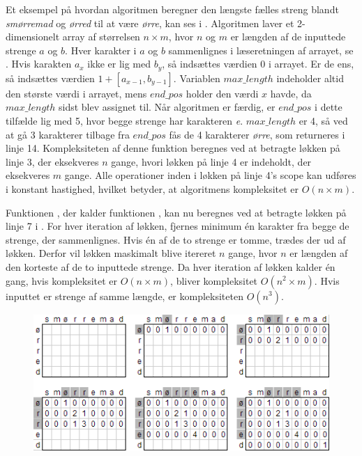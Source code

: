 Et eksempel på hvordan algoritmen beregner den længste fælles streng blandt \textit{smørremad} og \textit{ørred} til at være \textit{ørre}, kan ses i .
Algoritmen laver et 2-dimensionelt array af størrelsen $n \times m$, hvor $n$ og $m$ er længden af de inputtede strenge $a$ og $b$. Hver karakter i $a$ og $b$ sammenlignes i læseretningen af arrayet, se . Hvis karakten $a_x$ ikke er lig med $b_y$, så indsættes værdien 0 i arrayet. Er de ens, så indsættes værdien $1 + [a_{x-1}, b_{y-1}]$.
Variablen $max\_length$ indeholder altid den største værdi i arrayet, mens $end\_pos$ holder den værdi $x$ havde, da $max\_length$ sidst blev assignet til.
Når algoritmen er færdig, er $end\_pos$ i dette tilfælde lig med 5, hvor begge strenge har karakteren \textit{e}. $max\_length$ er 4, så ved at gå 3 karakterer tilbage fra $end\_pos$ fås de 4 karakterer \textit{ørre}, som returneres i linje 14. Kompleksiteten af denne funktion beregnes ved at betragte løkken på linje 3, der eksekveres $n$ gange, hvori løkken på linje 4 er indeholdt, der eksekveres $m$ gange. Alle operationer inden i løkken på linje 4's scope kan udføres i konstant hastighed, hvilket betyder, at algoritmens kompleksitet er $O(n \times m)$.

Funktionen , der kalder funktionen , kan nu beregnes ved at betragte løkken på linje 7 i . For hver iteration af løkken, fjernes minimum én karakter fra begge de strenge, der sammenlignes. Hvis én af de to strenge er tomme, trædes der ud af løkken. Derfor vil løkken maskimalt blive itereret $n$ gange, hvor $n$ er længden af den korteste af de to inputtede strenge.
Da hver iteration af løkken kalder  én gang, hvis kompleksitet er $O(n \times m)$, bliver  kompleksitet $O(n^2 \times m)$. Hvis inputtet er strenge af samme længde, er kompleksiteten $O(n^3)$.
\begin{figure}
\centering
\includegraphics[scale=1]{billeder/longest-common-substring.png}
  \label{fig:longest-common-substring}
\end{figure}

